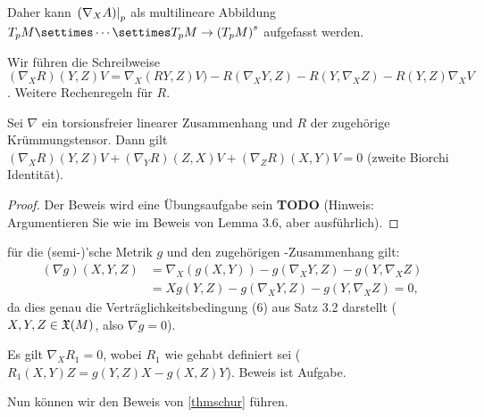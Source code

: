 \documentclass{article}
\begin{document}
Daher kann $\left. (\nabla_X A)\right\vert_p$ als multilineare Abbildung $T_p M \settimes \cdots \settimes T_p M \to {(T_p M)}^s$ aufgefasst werden.

Wir führen die Schreibweise $(\nabla_X R)(Y,Z)V = \nabla_X(RY,Z)V)-R(\nabla_X Y,Z)-R(Y,\nabla_X Z)-R(Y,Z)\nabla_X V$. Weitere Rechenregeln für $R$.

\begin{lemma}\label{lem312} Sei $\nabla$ ein torsionsfreier linearer Zusammenhang und $R$ der zugehörige Krümmungstensor. Dann gilt $(\nabla_X R)(Y,Z)V+(\nabla_Y R)(Z,X)V+(\nabla_Z R)(X,Y) V=0$ (zweite Biorchi Identität).
\end{lemma}

\begin{proof}
    Der Beweis wird eine Übungsaufgabe sein \textbf{TODO} (Hinweis: Argumentieren Sie wie im Beweis von Lemma 3.6, aber ausführlich).
\end{proof}

\begin{fact}
    für die (semi-)'sche Metrik $g$ und den zugehörigen -Zusammenhang gilt:
    \begin{align*}
        (\nabla g)(X,Y,Z) &= \nabla_X(g(X,Y))-g(\nabla_X Y,Z)-g(Y,\nabla_X Z)\\
        &= Xg(Y,Z)-g(\nabla_X Y,Z)-g(Y,\nabla_X Z)=0,
    \end{align*}
    da dies genau die Verträglichkeitsbedingung (6) aus Satz 3.2 darstellt ($X,Y,Z\in\mathfrak{X}(M)$, also $\nabla g = 0$).
\end{fact}

\begin{fact}\label{f314}
    Es gilt $\nabla_X R_1= 0$, wobei $R_1$ wie gehabt definiert sei ($R_1(X,Y)Z = g(Y,Z)X-g(X,Z)Y$). Beweis ist Aufgabe.
\end{fact}

Nun können wir den Beweis von \autoref{thmschur} führen.
\end{document}
